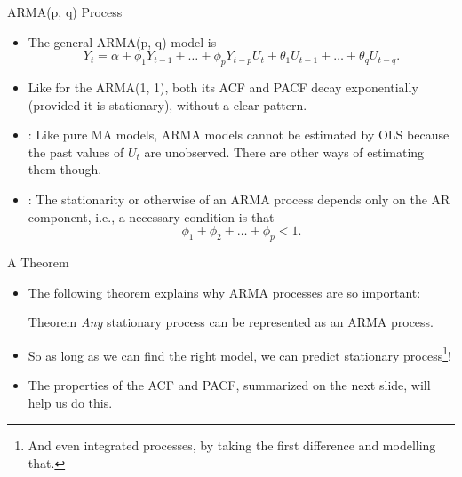 \begin{frame}{ARMA(p, q) Process}
\begin{itemize}
\item The general ARMA(p, q) model is
\begin{equation*}
Y_t= \alpha+\phi_1 Y_{t-1}+\ldots+\phi_p Y_{t-p}  U_t + \theta_1 U_{t-1} + \ldots+\theta_q U_{t-q}.
\end{equation*}
\item Like for the ARMA(1, 1), both its ACF and PACF decay exponentially (provided it is stationary), without a clear pattern.
\item {}: Like pure MA models, ARMA models cannot be estimated by OLS because the past values of $U_{t}$ are unobserved. There are other ways of estimating them though.
\item {}: The stationarity or otherwise of an ARMA process depends only on the AR component, i.e., a necessary condition is that
\begin{equation*}
\phi _1+\phi _2+\ldots +\phi _p<1 .
\end{equation*}
\end{itemize}
\end{frame}
\begin{frame}{A Theorem}
\begin{itemize}
\item The following theorem explains why ARMA processes are so important:
\begin{block}{Theorem}
\emph{\color{red}Any} stationary process can be represented as an ARMA process.
\end{block}
\item So as long as we can find the right model, we can predict  stationary process\footnote{And even integrated processes, by taking the first difference and modelling that.}!
\item The properties of the ACF and PACF, summarized on the next slide, will help us do this.
\end{itemize}
\end{frame}

